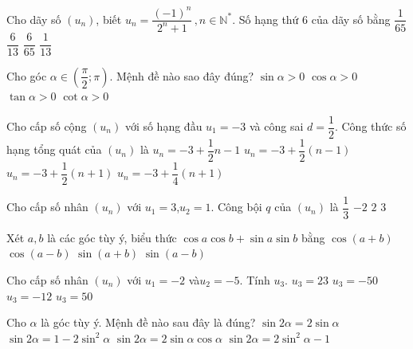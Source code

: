\begin{ex}%
	Cho dãy số $(u_n)$, biết $u_n=\dfrac{(-1)^n}{2^n+1}\,, n\in \mathbb{N}^*$. Số hạng thứ $6$ của dãy số bằng
	\choice
	{\True $\dfrac{1}{65}$}
	{$\dfrac{6}{13}$}
	{$\dfrac{6}{65}$}
	{$\dfrac{1}{13}$}
\end{ex}
\begin{ex}%
	Cho góc $\alpha \in \left( \dfrac{\pi }{2};\pi \right)$. Mệnh đề nào sao đây đúng?
	\choice
	{\True $\sin \alpha >0$}
	{$\cos \alpha >0$}
	{$\tan \alpha >0$}
	{$\cot \alpha >0$}
	\loigiai{
	}
\end{ex}
\begin{ex}%
	Cho cấp số cộng $(u_n)$ với số hạng đầu $u_1=-3$ và công sai $d=\dfrac{1}{2}$. Công thức số hạng tổng quát của $(u_n)$ là
	\choice
	{$u_n=-3+\dfrac{1}{2}n-1$}
	{\True $u_n=-3+\dfrac{1}{2}(n-1)$}
	{$u_n=-3+\dfrac{1}{2}(n+1)$}
	{$u_n=-3+\dfrac{1}{4}(n+1)$}
\end{ex}
\begin{ex}%
	Cho cấp số nhân $(u_n)$ với $u_1=3$,$u_2=1$. Công bội $q$ của $(u_n)$ là
	\choice
	{\True $\dfrac{1}{3}$}
	{$-2$}
	{$2$}
	{$3$}
\end{ex}
\begin{ex}%
	Xét $a,b$ là các góc tùy ý, biểu thức $\cos a\cos b+\sin a\sin b$ bằng
	\choice
	{$\cos (a+b)$}
	{\True $\cos (a-b)$}
	{$\sin (a+b)$}
	{$\sin (a-b)$}
\end{ex}
\begin{ex}%
	Cho cấp số nhân $(u_n)$ với $u_1=-2$ và$u_2=-5$. Tính ${{u}_3}$.
	\choice
	{${{u}_3}=23$}
	{\True ${{u}_3}=-50$}
	{${{u}_3}=-12$}
	{${{u}_3}=50$}
\end{ex}
\begin{ex}%
	Cho $\alpha $ là góc tùy ý. Mệnh đề nào sau đây là đúng?
	\choice
	{$\sin 2\alpha =2\sin \alpha $ }
	{$\sin 2\alpha =1-2\sin^2 \alpha $}
	{\True $\sin 2\alpha =2\sin \alpha \cos \alpha $ }
	{$\sin 2\alpha =2\sin^2 \alpha -1$}
\end{ex}
